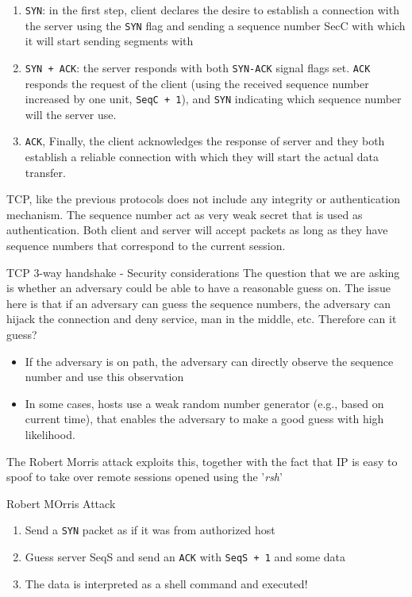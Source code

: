 \begin{enumerate}
    \item \texttt{SYN}: in the first step, client declares the desire to establish a connection with the server using the \texttt{SYN} flag and sending a sequence number SecC with which it will start sending segments with
    \item \texttt{SYN + ACK}: the server responds with both \texttt{SYN-ACK} signal flags set. \texttt{ACK} responds the request of the  client (using the received sequence number increased by one unit, \texttt{SeqC + 1}), and \texttt{SYN} indicating which sequence number will the server use.
    \item \texttt{ACK}, Finally, the client acknowledges the response of server and they both establish a reliable connection with which they will start the actual data transfer.
\end{enumerate}
TCP, like the previous protocols does not include any integrity or authentication mechanism. The sequence number act as very weak secret that is used as authentication. Both client and server will accept packets as long as they have sequence numbers that correspond to the current session.
\begin{parag}{TCP 3-way handshake - Security considerations}
    The question that we are asking is whether an adversary could be able to have a reasonable guess on. The issue here is that if an adversary can guess the sequence numbers, the adversary can hijack the connection and deny service, man in the middle, etc. Therefore can it guess?
	\begin{itemize}
	    \item If the adversary is on path, the adversary can directly observe the sequence number and use this observation
	    \item In some cases, hosts use a weak random number generator (e.g., based on current time), that enables the adversary to make a good guess with high likelihood.
	\end{itemize}
	The Robert Morris attack exploits this, together with the fact that IP is easy to spoof to take over remote sessions opened using the '\textit{rsh}'
	
	\begin{subparag}{Robert MOrris Attack}
	    \begin{enumerate}
	        \item Send a \texttt{SYN} packet  as if it was from authorized host
	        \item Guess server SeqS and send an \texttt{ACK} with \texttt{SeqS + 1} and some data
	        \item The data is interpreted as a shell command and executed!
	    \end{enumerate}
	    
	\end{subparag}
\end{parag}


